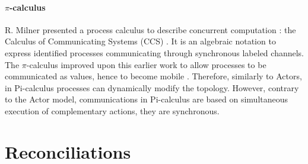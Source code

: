 \paragraph{$\pi$-calculus}

R. Milner presented a process calculus to describe concurrent computation : the Calculus of Communicating Systems (CCS) \cite{Milner1975, Milner1980}.
It is an algebraic notation to express identified processes communicating through synchronous labeled channels.
The $\pi$-calculus improved upon this earlier work to allow processes to be communicated as values, hence to become mobile \cite{Engberg1986,Milner1992a,Milner1992}.
Therefore, similarly to Actors, in Pi-calculus processes can dynamically modify the topology.
However, contrary to the Actor model, communications in Pi-calculus are based on simultaneous execution of complementary actions, they are synchronous.












\section{Reconciliations} \label{chapter3:reconciliations}


